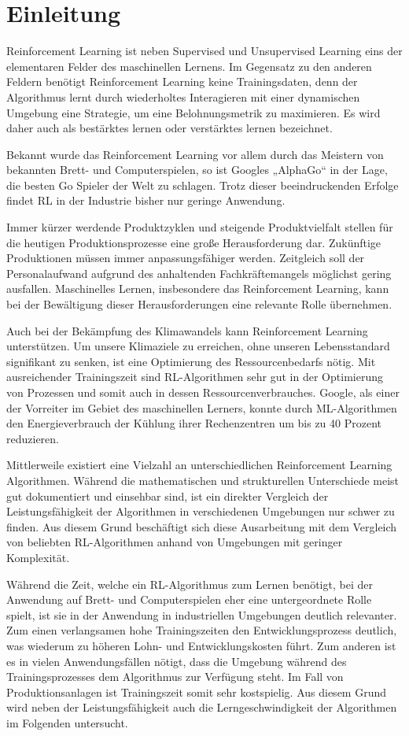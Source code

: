 \section{Einleitung}
Reinforcement Learning ist neben Supervised und Unsupervised Learning eins der elementaren Felder des maschinellen Lernens. 
Im Gegensatz zu den anderen Feldern benötigt Reinforcement Learning keine Trainingsdaten, 
denn der Algorithmus lernt durch wiederholtes Interagieren mit einer dynamischen Umgebung eine Strategie, 
um eine Belohnungsmetrik zu maximieren. Es wird daher auch als bestärktes lernen oder verstärktes lernen bezeichnet.

Bekannt wurde das Reinforcement Learning vor allem durch das Meistern von bekannten Brett- und Computerspielen, 
so ist Googles „AlphaGo“ in der Lage, die besten Go Spieler der Welt zu schlagen. 
Trotz dieser beeindruckenden Erfolge findet RL in der Industrie bisher nur geringe Anwendung.  

Immer kürzer werdende Produktzyklen und steigende Produktvielfalt stellen für die heutigen Produktionsprozesse eine große Herausforderung dar.
Zukünftige Produktionen müssen immer anpassungsfähiger werden. 
Zeitgleich soll der Personalaufwand aufgrund des anhaltenden Fachkräftemangels möglichst gering ausfallen. 
Maschinelles Lernen, insbesondere das Reinforcement Learning,
kann bei der Bewältigung dieser Herausforderungen eine relevante Rolle übernehmen.

Auch bei der Bekämpfung des Klimawandels kann Reinforcement Learning unterstützen. 
Um unsere Klimaziele zu erreichen, ohne unseren Lebensstandard signifikant zu senken, 
ist eine Optimierung des Ressourcenbedarfs nötig. 
Mit ausreichender Trainingszeit sind RL-Algorithmen sehr gut in der Optimierung von Prozessen und 
somit auch in dessen Ressourcenverbrauches. Google, als einer der Vorreiter im Gebiet des maschinellen Lerners, 
konnte durch ML-Algorithmen den Energieverbrauch der Kühlung ihrer Rechenzentren um bis zu 40 Prozent reduzieren.

Mittlerweile existiert eine Vielzahl an unterschiedlichen Reinforcement Learning Algorithmen. 
Während die mathematischen und strukturellen Unterschiede meist gut dokumentiert und einsehbar sind, 
ist ein direkter Vergleich der Leistungsfähigkeit der Algorithmen in verschiedenen Umgebungen nur schwer zu finden. 
Aus diesem Grund beschäftigt sich diese Ausarbeitung mit dem Vergleich von beliebten RL-Algorithmen anhand von Umgebungen mit geringer Komplexität.

Während die Zeit, welche ein RL-Algorithmus zum Lernen benötigt, bei der Anwendung auf Brett- und Computerspielen 
eher eine untergeordnete Rolle spielt, ist sie in der Anwendung in industriellen Umgebungen deutlich relevanter.
Zum einen verlangsamen hohe Trainingszeiten den Entwicklungsprozess deutlich, was wiederum zu höheren Lohn- und Entwicklungskosten führt. 
Zum anderen ist es in vielen Anwendungsfällen nötigt, dass die Umgebung während des Trainingsprozesses dem Algorithmus zur Verfügung steht. 
Im Fall von Produktionsanlagen ist Trainingszeit somit sehr kostspielig.
Aus diesem Grund wird neben der Leistungsfähigkeit auch die Lerngeschwindigkeit der Algorithmen im Folgenden untersucht. 


